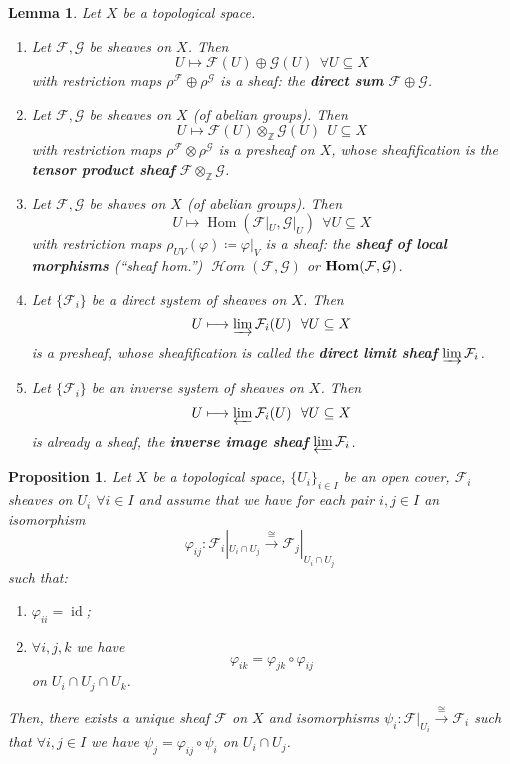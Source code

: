 \documentclass[12pt]{article}
\DeclareMathOperator{\id}{id}
\DeclareMathOperator{\Hom}{Hom}
\DeclareMathOperator{\shHom}{\mathcal H\textit{om}}
\DeclareMathOperator{\HOM}{\textnormal{\textbf{Hom}}}
\newtheorem*{proposition}{Proposition}
\newtheorem*{lemma}{Lemma}
\theoremstyle{definition}
\begin{document}
\begin{lemma}
Let $X$ be a topological space.

\begin{enumerate}[label=\arabic*)]
\item Let $\mathcal F,\mathcal G$ be sheaves on $X$. Then
\[U\longmapsto\mathcal F(U)\oplus\mathcal G(U)\ \ \forall U\subseteq X\]
with restriction maps $\rho^\mathcal F\oplus\rho^\mathcal G$ is a sheaf: the \textbf{direct sum} $\mathcal F\oplus\mathcal G$.

\item Let $\mathcal F,\mathcal G$ be sheaves on $X$ (of abelian groups). Then
\[U\longmapsto\mathcal F(U)\otimes_\mathbb Z\mathcal G(U)\ \ U\subseteq X\]
with restriction maps $\rho^\mathcal F\otimes\rho^\mathcal G$ is a presheaf on $X$, whose sheafification is the \textbf{tensor product sheaf} $\mathcal F\otimes_\mathbb Z\mathcal G$.

\item Let $\mathcal F,\mathcal G$ be shaves on $X$ (of abelian groups). Then
\[U\longmapsto\Hom(\mathcal F|_U,\mathcal G|_U)\ \ \forall U\subseteq X\]
with restriction maps $\rho_{UV}(\varphi)\coloneqq\varphi|_V$ is a sheaf: the \textbf{sheaf of local morphisms} (``sheaf hom.'') $\shHom(\mathcal F,\mathcal G)$ or $\HOM(\mathcal F,\mathcal G)$.

\item Let $\{\mathcal F_i\}$ be a direct system of sheaves on $X$. Then
\[U\longmapsto\varinjlim\mathcal F_i(U)\ \ \forall U\subseteq X\]
is a presheaf, whose sheafification is called the \textbf{direct limit sheaf} $\varinjlim\mathcal F_i$.

\item Let $\{\mathcal F_i\}$ be an inverse system of sheaves on $X$. Then
\[U\longmapsto\varprojlim\mathcal F_i(U)\ \ \forall U\subseteq X\]
is already a sheaf, the \textbf{inverse image sheaf} $\varprojlim\mathcal F_i$.
\end{enumerate}
\end{lemma}

\begin{proposition}
Let $X$ be a topological space, $\{U_i\}_{i\in I}$ be an open cover, $\mathcal F_i$ sheaves on $U_i$ $\forall i\in I$ and assume that we have for each pair $i,j\in I$ an isomorphism
\[\varphi_{ij}:\mathcal F_i|_{U_i\cap U_j}\overset\cong\longrightarrow\mathcal F_j|_{U_i\cap U_j}\]
such that:
\begin{enumerate}[label=\arabic*)]
\item $\varphi_{ii}=\id$;
\item $\forall i,j,k$ we have
\[\varphi_{ik}=\varphi_{jk}\circ\varphi_{ij}\]
on $U_i\cap U_j\cap U_k$.
\end{enumerate}

Then, there exists a unique sheaf $\mathcal F$ on $X$ and isomorphisms $\psi_i:\mathcal F|_{U_i}\xrightarrow{\cong}\mathcal F_i$ such that $\forall i,j\in I$ we have $\psi_j=\varphi_{ij}\circ\psi_i$ on $U_i\cap U_j$.
\end{proposition}
\end{document}
